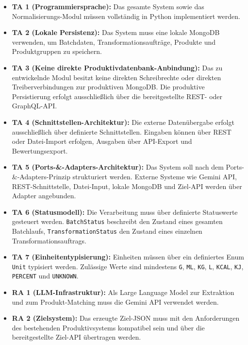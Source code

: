 \documentclass[11pt,a4paper]{article}
\begin{document}
\begin{itemize}[leftmargin=*]
    \item \textbf{TA 1 (Programmiersprache):} Das gesamte System sowie das Normalisierungs-Modul müssen vollständig in Python implementiert werden.
    
    \item \textbf{TA 2 (Lokale Persistenz):} Das System muss eine lokale MongoDB verwenden, um Batchdaten, Transformationsaufträge, Produkte und Produktgruppen zu speichern.
    
    \item \textbf{TA 3 (Keine direkte Produktivdatenbank-Anbindung):} Das zu entwickelnde Modul besitzt keine direkten Schreibrechte oder direkten Treiberverbindungen zur produktiven MongoDB. Die produktive Persistierung erfolgt ausschließlich über die bereitgestellte REST- oder GraphQL-API.
    
    \item \textbf{TA 4 (Schnittstellen-Architektur):} Die externe Datenübergabe erfolgt ausschließlich über definierte Schnittstellen. Eingaben können über REST oder Datei-Import erfolgen, Ausgaben über API-Export und Bewertungsexport.
    
    \item \textbf{TA 5 (Ports-\&-Adapters-Architektur):} Das System soll nach dem Ports-\&-Adapters-Prinzip strukturiert werden. Externe Systeme wie Gemini API, REST-Schnittstelle, Datei-Input, lokale MongoDB und Ziel-API werden über Adapter angebunden.
    
    \item \textbf{TA 6 (Statusmodell):} Die Verarbeitung muss über definierte Statuswerte gesteuert werden. \texttt{BatchStatus} beschreibt den Zustand eines gesamten Batchlaufs, \texttt{TransformationStatus} den Zustand eines einzelnen Transformationsauftrags.
    
    \item \textbf{TA 7 (Einheitentypisierung):} Einheiten müssen über ein definiertes Enum \texttt{Unit} typisiert werden. Zulässige Werte sind mindestens \texttt{G}, \texttt{ML}, \texttt{KG}, \texttt{L}, \texttt{KCAL}, \texttt{KJ}, \texttt{PERCENT} und \texttt{UNKNOWN}.
    
    \item \textbf{RA 1 (LLM-Infrastruktur):} Als Large Language Model zur Extraktion und zum Produkt-Matching muss die Gemini API verwendet werden.
    
    \item \textbf{RA 2 (Zielsystem):} Das erzeugte Ziel-JSON muss mit den Anforderungen des bestehenden Produktivsystems kompatibel sein und über die bereitgestellte Ziel-API übertragen werden.
\end{itemize}
\end{document}
